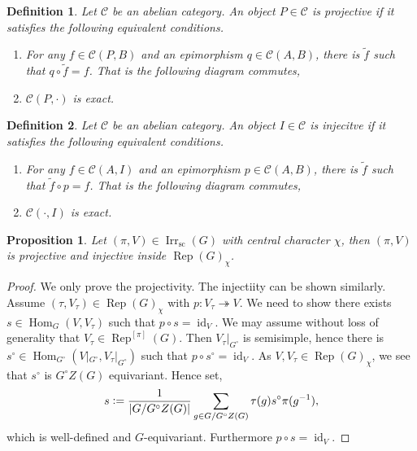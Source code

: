\documentclass[8pt]{article}
\newtheorem{proposition}{Proposition}[section]
\newtheorem{definition}{Definition}[section]
\DeclareMathOperator{\Rep}{Rep}
\DeclareMathOperator{\Hom}{Hom}
\DeclareMathOperator{\id}{id}
\DeclareMathOperator{\supcus}{sc}
\DeclareMathOperator{\Irr}{Irr}
\newcommand{\defeq}{\vcentcolon=}
\newcommand{\cat}{\mathscr{C}}
\begin{document}
\begin{definition}
Let $\cat$ be an abelian category. An object $P\in\cat$ is projective if it satisfies the following equivalent conditions.
\begin{enumerate}
  \item For any $f\in\cat(P,B)$ and an epimorphism $q\in\cat(A,B)$, there is $\widetilde{f}$ such that $q\circ \widetilde{f} = f$. That is the following diagram commutes,
  \begin{center}
  \end{center}
  \item $\cat(P,\cdot)$ is exact.
\end{enumerate}
\end{definition}
\begin{definition}
Let $\cat$ be an abelian category. An object $I\in\cat$ is injecitve if it satisfies the following equivalent conditions.
\begin{enumerate}
  \item For any $f\in\cat(A,I)$ and an epimorphism $p\in\cat(A,B)$, there is $\widetilde{f}$ such that $\widetilde{f}\circ p = f$. That is the following diagram commutes,
  \begin{center}
  \end{center}
  \item $\cat(\cdot,I)$ is exact.
\end{enumerate}
\end{definition}
\begin{proposition}
  \label{proposition_60}
  Let $(\pi,V)\in\Irr_{\supcus}(G)$ with central character $\chi$, then $(\pi,V)$ is projective and injective inside $\Rep(G)_\chi$. 
\end{proposition}
\begin{proof}
  We only prove the projectivity. The injectiity can be shown similarly. Assume $(\tau,V_\tau)\in\Rep(G)_\chi$ with $p:V_\tau\twoheadrightarrow V$. We need to show there exists $s\in\Hom_G(V,V_\tau)$ such that $p\circ s = \id_V$. We may assume without loss of generality that $V_\tau\in\Rep^{[\pi]}(G)$. Then $V_\tau|_{G^\circ}$ is semisimple, hence there is $s^\circ\in\Hom_{G^\circ}(V|_{G^\circ},V_\tau|_{G^\circ})$ such that $p\circ s^\circ = \id_V$. 
  As $V,V_\tau\in\Rep(G)_\chi$, we see that $s^\circ$ is $G^\circ Z(G)$ equivariant. Hence set,
  \begin{equation*}
    s \defeq {\frac 1 {\vert G/G^\circ Z(G)\vert}}\sum_{g\in G/G^\circ Z(G)}\tau(g) s^\circ \pi(g^{-1}),
  \end{equation*}
  which is well-defined and $G$-equivariant. Furthermore $p\circ s = \id_V$.
\end{proof}
\end{document}
